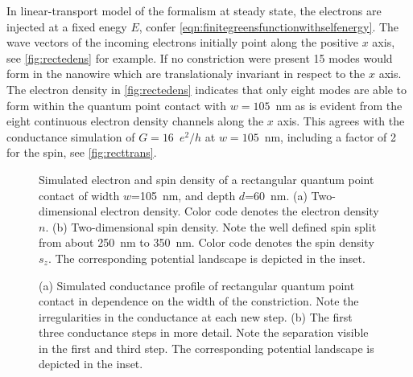In linear-transport model of the \gfnc{} formalism at steady state, the electrons are injected at a fixed enegy $E$, confer \cref{eqn:finitegreensfunctionwithselfenergy}. The wave vectors of the incoming electrons initially point along the positive $x$ axis, see \cref{fig:rectedens} for example. If no constriction were present 15 modes would form in the nanowire which are translationaly invariant in respect to the $x$ axis. The electron density in \cref{fig:rectedens} indicates that only eight modes are able to form within the quantum point contact with $w=105$~nm as is evident from the eight continuous electron density channels along the $x$ axis. This agrees with the conductance simulation of $G=16$~$e^2/h$ at $w=105$~nm, including a factor of 2 for the spin, see \cref{fig:recttrans}.\par
\begin{figure}[t]
  \hspace{14pt}
  \hspace{4pt}
  \caption{Simulated electron and spin density of a rectangular quantum point contact of  width $w$=105~nm, and depth $d$=60~nm. (a) Two-dimensional electron density. Color code denotes the electron density $n$. (b) Two-dimensional spin density. Note the well defined spin split from about 250~nm to 350~nm. Color code denotes the spin density $s_z$. The corresponding potential landscape is depicted in the inset.}
\end{figure}
\begin{figure}[h]
  \centering
  \caption{(a) Simulated conductance profile of rectangular quantum point contact in dependence on the width of the constriction. Note the irregularities in the conductance at each new step. (b) The first three conductance steps in more detail. Note the separation visible in the first and third step. The corresponding potential landscape is depicted in the inset.}
\end{figure}
